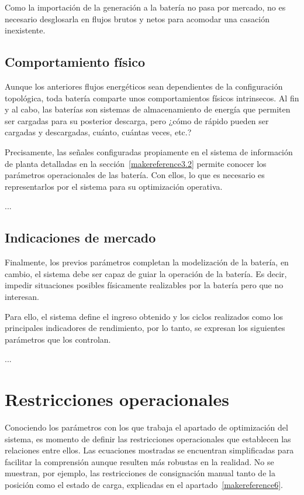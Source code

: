 Como la importación de la generación a la batería no pasa por mercado, no es necesario desglosarla en flujos brutos y netos para acomodar una casación inexistente.

\subsection{Comportamiento físico}
\label{makereference5.1.3}

Aunque los anteriores flujos energéticos sean dependientes de la configuración topológica, toda batería comparte unos comportamientos físicos intrinsecos. Al fin y al cabo, las baterías son sistemas de almacenamiento de energía que permiten ser cargadas para su posterior descarga, pero ¿cómo de rápido pueden ser cargadas y descargadas, cuánto, cuántas veces, etc.?

Precisamente, las señales configuradas propiamente en el sistema de información de planta detalladas en la sección~\ref{makereference3.2} permite conocer los parámetros operacionales de las batería. Con ellos, lo que es necesario es representarlos por el sistema para su optimización operativa.

...

\subsection{Indicaciones de mercado}
\label{makereference5.1.4}

Finalmente, los previos parámetros completan la modelización de la batería, en cambio, el sistema debe ser capaz de guiar la operación de la batería. Es decir, impedir situaciones posibles físicamente realizables por la batería pero que no interesan.

Para ello, el sistema define el ingreso obtenido y los ciclos realizados como los principales indicadores de rendimiento, por lo tanto, se expresan los siguientes parámetros que los controlan.

...

\section{Restricciones operacionales}
\label{makereference5.2}

Conociendo los parámetros con los que trabaja el apartado de optimización del sistema, es momento de definir las restricciones operacionales que establecen las relaciones entre ellos. Las ecuaciones mostradas se encuentran simplificadas para facilitar la comprensión aunque resulten más robustas en la realidad. No se muestran, por ejemplo, las restricciones de consignación manual tanto de la posición como el estado de carga, explicadas en el apartado~\ref{makereference6}.

